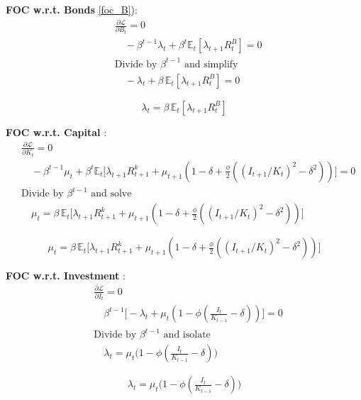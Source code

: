 \documentclass[11pt,preprint]{elsarticle}
\numberwithin{equation}{section}
\numberwithin{figure}{section}
\numberwithin{table}{section}
\begin{document}
\textbf{FOC w.r.t. Bonds} \eqref{foc_B}): \begin{align*}
  & \frac{\partial \mathcal{L}}{\partial B_t} = 0 \\
  & \quad -\beta^{t-1}\lambda_t + \beta^t\mathbb{E}_t[\lambda_{t+1}R^B_t] = 0 \\[6pt]
  & \text{Divide by }\beta^{t-1}\text{ and simplify} \\
  & \quad -\lambda_t + \beta\,\mathbb{E}_t[\lambda_{t+1}R^B_t] = 0
\end{align*}

\begin{equation}\label{foc_B}
\boxed{\lambda_t = \beta\,\mathbb{E}_t[\lambda_{t+1}R^B_t]}
\end{equation}

\textbf{FOC w.r.t. Capital} : \begin{align*}
  & \frac{\partial \mathcal{L}}{\partial K_t} = 0 \\
  & \quad -\beta^{t-1}\mu_t + \beta^t\mathbb{E}_t\bigl[\lambda_{t+1}R^k_{t+1} + \mu_{t+1}(1-\delta + \tfrac{\phi}{2}((I_{t+1}/K_t)^2 - \delta^2))\bigr] = 0 \\[6pt]
  & \text{Divide by }\beta^{t-1}\text{ and solve} \\
  & \quad \mu_t = \beta\,\mathbb{E}_t\bigl[\lambda_{t+1}R^k_{t+1} + \mu_{t+1}(1-\delta + \tfrac{\phi}{2}((I_{t+1}/K_t)^2 - \delta^2))\bigr]
\end{align*}

\begin{equation}\label{foc_K}
\boxed{\mu_t = \beta\,\mathbb{E}_t\bigl[\lambda_{t+1}R^k_{t+1} + \mu_{t+1}(1-\delta + \tfrac{\phi}{2}((I_{t+1}/K_t)^2 - \delta^2))\bigr]}
\end{equation}

\textbf{FOC w.r.t. Investment} : \begin{align*}
  & \frac{\partial \mathcal{L}}{\partial I_t} = 0 \\
  & \quad \beta^{t-1}\bigl[-\lambda_t + \mu_t(1 - \phi(\tfrac{I_t}{K_{t-1}} - \delta))\bigr] = 0 \\[6pt]
  & \text{Divide by }\beta^{t-1}\text{ and isolate} \\
  & \quad \lambda_t = \mu_t\bigl(1 - \phi(\tfrac{I_t}{K_{t-1}} - \delta)\bigr)
\end{align*}

\begin{equation}\label{foc_I}
\boxed{\lambda_t = \mu_t\bigl(1 - \phi(\tfrac{I_t}{K_{t-1}} - \delta)\bigr)}
\end{equation}
\end{document}
